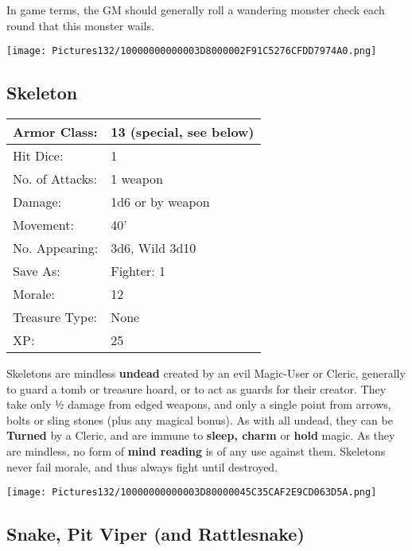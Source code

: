 \documentclass[a4paper,twoside,openany,10pt]{book}
\begin{document}
\begin{multicols}{2}
In game terms, the GM should generally roll a wandering monster check each
round that this monster wails.

\begin{center} \texttt{[image: Pictures132/10000000000003D8000002F91C5276CFDD7974A0.png]} \end{center}


\subsection*{Skeleton}\label{skeleton}

\begin{tabularx}{0.50\textwidth}{@{}lX@{}}
Armor Class: & 13 (special, see below) \\\hline
Hit Dice: & 1 \\\hline
No. of Attacks: & 1 weapon \\\hline
Damage: & 1d6 or by weapon \\\hline
Movement: & 40' \\\hline
No. Appearing: & 3d6, Wild 3d10 \\\hline
Save As: & Fighter: 1 \\\hline
Morale: & 12 \\\hline
Treasure Type: & None \\\hline
XP: & 25 \\\hline
\end{tabularx}\medskip

Skeletons
are mindless \textbf{undead} created by an evil Magic-User or Cleric, generally to guard a tomb or treasure hoard, or to act as guards for their creator. They take only ½ damage from edged weapons, and only a single point from arrows, bolts or sling stones (plus any magical bonus). As with all undead, they can be \textbf{Turned} by a Cleric, and are immune to \textbf{sleep, charm} or \textbf{hold} magic. As they are mindless, no form of \textbf{mind reading} is of any use against them. Skeletons never fail morale, and thus always fight until destroyed.

\begin{center} \texttt{[image: Pictures132/10000000000003D80000045C35CAF2E9CD063D5A.png]} \end{center}


\subsection*{Snake, Pit Viper (and Rattlesnake)}\label{snake-pit-viper-and-rattlesnake}


\end{multicols}
\end{document}
